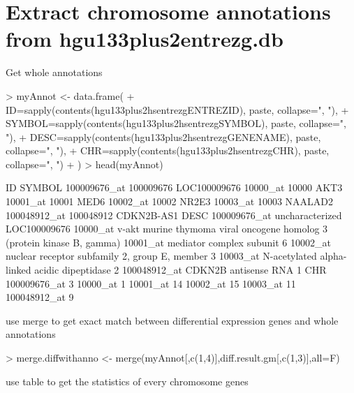 \documentclass[12pt]{article}
\begin{document}
\section{Extract chromosome annotations from hgu133plus2entrezg.db}
Get whole annotations
\begin{Schunk}
\begin{Sinput}
> myAnnot <- data.frame(
+     ID=sapply(contents(hgu133plus2hsentrezgENTREZID), paste, collapse=", "), 
+     SYMBOL=sapply(contents(hgu133plus2hsentrezgSYMBOL), paste, collapse=", "), 
+     DESC=sapply(contents(hgu133plus2hsentrezgGENENAME), paste, collapse=", "),
+     CHR=sapply(contents(hgu133plus2hsentrezgCHR), paste, collapse=", ")
+ )
> head(myAnnot)
\end{Sinput}
\begin{Soutput}
                    ID       SYMBOL
100009676_at 100009676 LOC100009676
10000_at         10000         AKT3
10001_at         10001         MED6
10002_at         10002        NR2E3
10003_at         10003      NAALAD2
100048912_at 100048912   CDKN2B-AS1
                                                                                DESC
100009676_at                                            uncharacterized LOC100009676
10000_at     v-akt murine thymoma viral oncogene homolog 3 (protein kinase B, gamma)
10001_at                                                  mediator complex subunit 6
10002_at                             nuclear receptor subfamily 2, group E, member 3
10003_at                              N-acetylated alpha-linked acidic dipeptidase 2
100048912_at                                                  CDKN2B antisense RNA 1
             CHR
100009676_at   3
10000_at       1
10001_at      14
10002_at      15
10003_at      11
100048912_at   9
\end{Soutput}
\end{Schunk}

use merge to get exact match between differential expression genes and
whole annotations
\begin{Schunk}
\begin{Sinput}
> merge.diffwithanno <- merge(myAnnot[,c(1,4)],diff.result.gm[,c(1,3)],all=F)
\end{Sinput}
\end{Schunk}

use table to get the statistics of every chromosome genes

\begin{Schunk}
\end{Schunk}
\end{document}
